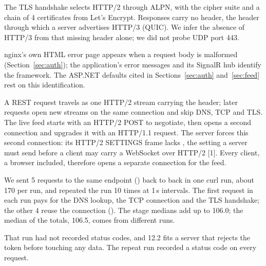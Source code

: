 \seclabel
{}

 The TLS handshake selects HTTP/2 through ALPN, with the cipher suite  and a chain of 4 certificates from Let's Encrypt. Responses carry no  header, the header through which a server advertises HTTP/3 (QUIC). We infer the absence of HTTP/3 from that missing header alone; we did not probe UDP port 443.

 nginx's own HTML error page appears when a request body is malformed (Section~\ref{sec:auth}); the application's error messages and its SignalR hub identify the framework. The ASP.NET defaults cited in Sections~\ref{sec:auth} and~\ref{sec:feed} rest on this identification.

 A REST request travels as one HTTP/2 stream carrying the  header; later requests open new streams on the same connection and skip DNS, TCP and TLS. The live feed starts with an HTTP/2 POST to negotiate, then opens a second connection and upgrades it with an HTTP/1.1  request. The server forces this second connection: its HTTP/2 SETTINGS frame lacks , the setting a server must send before a client may carry a WebSocket over HTTP/2 [1]. Every client, a browser included, therefore opens a separate connection for the feed.



 We sent 5 requests to the same endpoint () back to back in one curl run, about 170\ms{} per run, and repeated the run 10 times at 1\,s intervals. The first request in each run pays for the DNS lookup, the TCP connection and the TLS handshake; the other 4 reuse the connection (). The stage medians add up to 106.0\ms; the median of the totals, 106.5\ms, comes from different runs.




 That run had not recorded status codes, and 12.2\ms{} fits a server that rejects the token before touching any data. The repeat run recorded a status code on every request.


